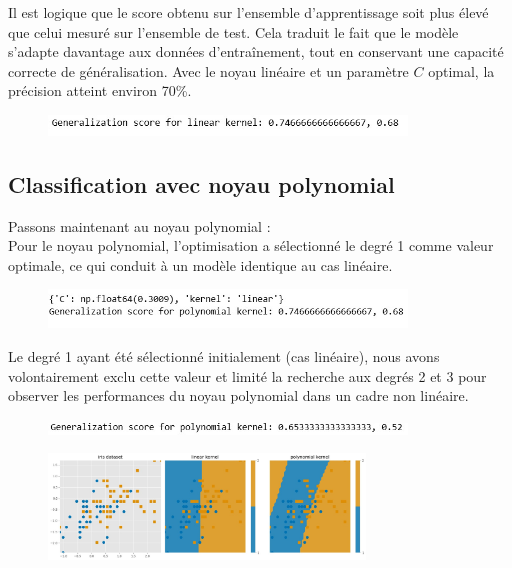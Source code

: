 \documentclass[12pt]{article}
\begin{document}
Il est logique que le score obtenu sur l’ensemble d’apprentissage soit plus élevé que celui mesuré sur l’ensemble de test. Cela traduit le fait que le modèle s’adapte davantage aux données d’entraînement, tout en conservant une capacité correcte de généralisation. Avec le noyau linéaire et un paramètre $C$ optimal, la précision atteint environ 70\%.

\begin{figure}[h!]
  \centering
  \includegraphics[width=0.85\textwidth]{images/lineaire_noyau.jpg}
\end{figure}

\subsection{Classification avec noyau polynomial}
 Passons maintenant au noyau polynomial :\\
Pour le noyau polynomial, l’optimisation a sélectionné le degré 1 comme valeur optimale, ce qui conduit à un modèle identique au cas linéaire. 
 \begin{figure}[h!]
  \centering
  \includegraphics[width=0.85\textwidth]{images/poly_noyau_deg1.jpg}
\end{figure}

Le degré 1 ayant été sélectionné initialement (cas linéaire), nous avons volontairement exclu cette valeur et limité la recherche aux degrés 2 et 3 pour observer les performances du noyau polynomial dans un cadre non linéaire.
 \begin{figure}[h!]
  \centering
  \includegraphics[width=0.85\textwidth]{images/poly_noyau_deg_2.jpg}
\end{figure}

 \begin{figure}[h!]
  \centering
  \includegraphics[width=0.75\textwidth]{images/lin_vs_poly.jpg}
\end{figure}
\end{document}
